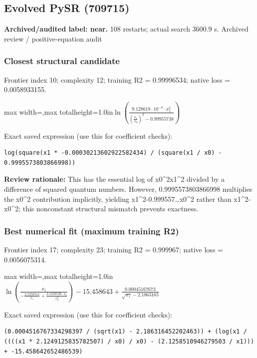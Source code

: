 \documentclass[10pt,letterpaper,landscape]{article}
\begin{document}
\begin{minipage}[t]{0.485\textwidth}
\subsection*{Evolved PySR (709715)}
\textbf{Archived/audited label: near.} 108 restarts; actual search 3600.9 s.
{\small Archived review / positive-equation audit}
\subsubsection*{Closest structural candidate}
Frontier index 10; complexity 12; training R2 = 0.99996534; native loss = 0.0058933155.
\begin{center}\begin{adjustbox}{max width=\linewidth,max totalheight=1.0in}$\displaystyle \ln{\left(\frac{9.128618 \cdot 10^{-8} \cdot x_{1}^{2}}{\left(\frac{x_{1}}{x_{0}}\right)^{2} - 0.99955738} \right)}$\end{adjustbox}\end{center}
{\scriptsize Exact saved expression (use this for coefficient checks):}
\begin{lstlisting}
log(square(x1 * -0.00030213602922582434) / (square(x1 / x0) - 0.9995573803866998))
\end{lstlisting}
{\small\textbf{Review rationale:} This has the essential log of x0\textasciicircum{}2x1\textasciicircum{}2 divided by a difference of squared quantum numbers. However, 0.9995573803866998 multiplies the x0\textasciicircum{}2 contribution implicitly, yielding x1\textasciicircum{}2-0.999557…x0\textasciicircum{}2 rather than x1\textasciicircum{}2-x0\textasciicircum{}2; this nonconstant structural mismatch prevents exactness.}
\subsubsection*{Best numerical fit (maximum training R2)}
Frontier index 17; complexity 23; training R2 = 0.999967; native loss = 0.0056075314.
\begin{center}\begin{adjustbox}{max width=\linewidth,max totalheight=1.0in}$\displaystyle \ln{\left(\frac{x_{1}}{- \frac{2.1258511}{x_{1}} + \frac{2.1249126 \cdot x_{1}}{x_{0}^{2}}} \right)} - 15.458643 + \frac{0.00045167673}{\sqrt{x_{1}} - 2.1863165}$\end{adjustbox}\end{center}
{\scriptsize Exact saved expression (use this for coefficient checks):}
\begin{lstlisting}
(0.0004516767334298397 / (sqrt(x1) - 2.186316452202463)) + (log(x1 / ((((x1 * 2.1249125835782507) / x0) / x0) - (2.1258510946279503 / x1))) + -15.458642652486539)
\end{lstlisting}
\end{minipage}
\clearpage{}\label{rydberg-10007}
\end{document}
